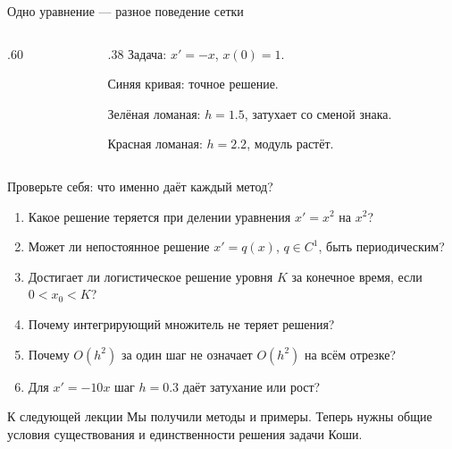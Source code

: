 \documentclass[aspectratio=169,11pt]{beamer}
\begin{document}
\begin{frame}{Одно уравнение --- разное поведение сетки}
\begin{columns}[c]
\begin{column}{.60\textwidth}
\centering
{}
\end{column}
\begin{column}{.38\textwidth}
Задача: $x'=-x$, $x(0)=1$.
\medskip

{\color{blue!75!black}Синяя кривая}: точное решение.
\medskip

{\color{teal!75!black}Зелёная ломаная}: $h=1.5$, затухает со сменой знака.
\medskip

{\color{red!75!black}Красная ломаная}: $h=2.2$, модуль растёт.
\end{column}
\end{columns}
\end{frame}

\begin{frame}{Проверьте себя: что именно даёт каждый метод?}
\begin{enumerate}
\item Какое решение теряется при делении уравнения $x'=x^2$ на $x^2$?
\item Может ли непостоянное решение $x'=q(x)$, $q\in C^1$,
быть периодическим?
\item Достигает ли логистическое решение уровня $K$ за конечное время,
если $0<x_0<K$?
\item Почему интегрирующий множитель не теряет решения?
\item Почему $O(h^2)$ за один шаг не означает $O(h^2)$ на всём отрезке?
\item Для $x'=-10x$ шаг $h=0.3$ даёт затухание или рост?
\end{enumerate}
\begin{block}{К следующей лекции}
Мы получили методы и примеры. Теперь нужны общие условия
существования и единственности решения задачи Коши.
\end{block}
\end{frame}
\end{document}
